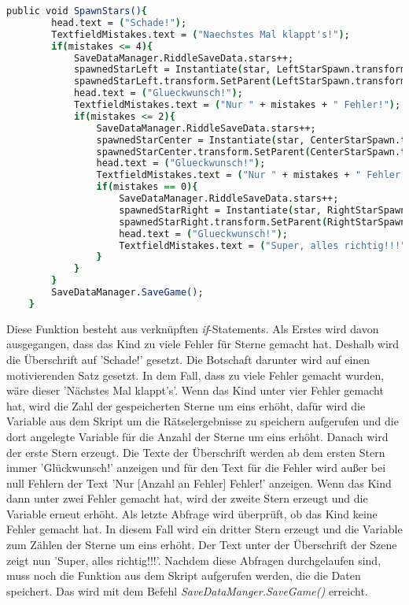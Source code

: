 \begin{lstlisting}[language=csh, caption={SpawnStars.cs Start-Funktion}]
	public void SpawnStars(){
		head.text = ("Schade!");
		TextfieldMistakes.text = ("Naechstes Mal klappt's!");
		if(mistakes <= 4){
			SaveDataManager.RiddleSaveData.stars++;
			spawnedStarLeft = Instantiate(star, LeftStarSpawn.transform.position, Quaternion.identity);
			spawnedStarLeft.transform.SetParent(LeftStarSpawn.transform);
			head.text = ("Glueckwunsch!");
			TextfieldMistakes.text = ("Nur " + mistakes + " Fehler!");
			if(mistakes <= 2){
				SaveDataManager.RiddleSaveData.stars++;
				spawnedStarCenter = Instantiate(star, CenterStarSpawn.transform.position, Quaternion.identity);
				spawnedStarCenter.transform.SetParent(CenterStarSpawn.transform);
				head.text = ("Glueckwunsch!");
				TextfieldMistakes.text = ("Nur " + mistakes + " Fehler!");
				if(mistakes == 0){
					SaveDataManager.RiddleSaveData.stars++;
					spawnedStarRight = Instantiate(star, RightStarSpawn.transform.position, Quaternion.identity);
					spawnedStarRight.transform.SetParent(RightStarSpawn.transform);
					head.text = ("Glueckwunsch!");
					TextfieldMistakes.text = ("Super, alles richtig!!!");
				}
			}
		}
		SaveDataManager.SaveGame();
	}
\end{lstlisting}
Diese Funktion besteht aus verknüpften \textit{if}-Statements. Als Erstes wird davon ausgegangen, dass das Kind zu viele Fehler für Sterne gemacht hat. Deshalb wird die Überschrift auf 'Schade!' gesetzt. Die Botschaft darunter wird auf einen motivierenden Satz gesetzt. In dem Fall, dass zu viele Fehler gemacht wurden, wäre dieser 'Nächstes Mal klappt's'. Wenn das Kind unter vier Fehler gemacht hat, wird die Zahl der gespeicherten Sterne um eins erhöht, dafür wird die Variable aus dem Skript um die Rätselergebnisse zu speichern aufgerufen und die dort angelegte Variable für die Anzahl der Sterne um eins erhöht. Danach wird der erste Stern erzeugt. Die Texte der Überschrift werden ab dem ersten Stern immer 'Glückwunsch!' anzeigen und für den Text für die Fehler wird außer bei null Fehlern der Text 'Nur [Anzahl an Fehler] Fehler!' anzeigen. Wenn das Kind dann unter zwei Fehler gemacht hat, wird der zweite Stern erzeugt und die Variable erneut erhöht. Als letzte Abfrage wird überprüft, ob das Kind keine Fehler gemacht hat. In diesem Fall wird ein dritter Stern erzeugt und die Variable zum Zählen der Sterne um eins erhöht. Der Text unter der Überschrift der Szene zeigt nun 'Super, alles richtig!!!'. Nachdem diese Abfragen durchgelaufen sind, muss noch die Funktion aus dem Skript aufgerufen werden, die die Daten speichert. Das wird mit dem Befehl \textit{SaveDataManger.SaveGame()} erreicht.\\